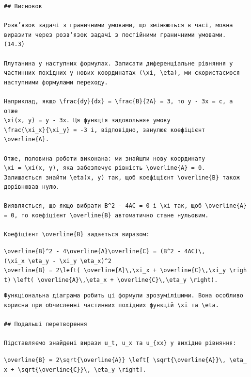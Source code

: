 \documentclass[
  ukrainian,
]{article}
\begin{document}
\begin{verbatim}
## Висновок

Розв’язок задачі з граничними умовами, що змінюються в часі, можна виразити через розв’язок задачі з постійними граничними умовами.
(14.3)

Плутанина у наступних формулах. Записати диференціальне рівняння у частинних похідних у нових координатах (\xi, \eta), ми скористаємося наступними формулами переходу.

Наприклад, якщо \frac{dy}{dx} = \frac{B}{2A} = 3, то y - 3x = c, а отже  
\xi(x, y) = y - 3x. Ця функція задовольняє умову  
\frac{\xi_x}{\xi_y} = -3 і, відповідно, занулює коефіцієнт \overline{A}.

Отже, половина роботи виконана: ми знайшли нову координату  
\xi = \xi(x, y), яка забезпечує рівність \overline{A} = 0.  
Залишається знайти \eta(x, y) так, щоб коефіцієнт \overline{B} також дорівнював нулю.

Виявляється, що якщо вибрати B^2 - 4AC = 0 і \xi так, щоб \overline{A} = 0, то коефіцієнт \overline{B} автоматично стане нульовим.

Коефіцієнт \overline{B} задається виразом:
\end{verbatim}

\texttt{\textbackslash{}overline\{B\}\^{}2\ -\ 4\textbackslash{}overline\{A\}\textbackslash{}overline\{C\}\ =\ (B\^{}2\ -\ 4AC)\textbackslash{},(\textbackslash{}xi\_x\ \textbackslash{}eta\_y\ -\ \textbackslash{}xi\_y\ \textbackslash{}eta\_x)\^{}2}
\texttt{\textbackslash{}overline\{B\}\ =\ 2\textbackslash{}left(\ \textbackslash{}overline\{A\}\textbackslash{},\textbackslash{}xi\_x\ +\ \textbackslash{}overline\{C\}\textbackslash{},\textbackslash{}xi\_y\ \textbackslash{}right)}
\texttt{\textbackslash{}left(\ \textbackslash{}overline\{A\}\textbackslash{},\textbackslash{}eta\_x\ +\ \textbackslash{}overline\{C\}\textbackslash{},\textbackslash{}eta\_y\ \textbackslash{}right).}

\begin{verbatim}
Функціональна діаграма робить ці формули зрозумілішими. Вона особливо корисна при обчисленні частинних похідних функцій \xi та \eta.

## Подальші перетворення

Підставляємо знайдені вирази u_t, u_x та u_{xx} у вихідне рівняння:
\end{verbatim}

\texttt{\textbackslash{}overline\{B\}\ =\ 2\textbackslash{}sqrt\{\textbackslash{}overline\{A\}\}\ \textbackslash{}left{[}\ \textbackslash{}sqrt\{\textbackslash{}overline\{A\}\}\textbackslash{},\ \textbackslash{}eta\_x\ +\ \textbackslash{}sqrt\{\textbackslash{}overline\{C\}\}\textbackslash{},\ \textbackslash{}eta\_y\ \textbackslash{}right{]}.}
\end{document}
